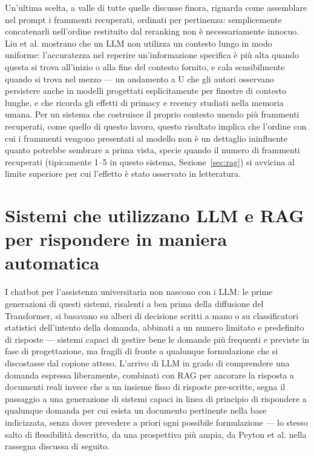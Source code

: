 Un'ultima scelta, a valle di tutte quelle discusse finora, riguarda come assemblare nel prompt i frammenti
recuperati, ordinati per pertinenza: semplicemente concatenarli nell'ordine restituito dal reranking non è
necessariamente innocuo. Liu et al. \cite{liu2023lostmiddle} mostrano che un LLM non utilizza un contesto lungo in
modo uniforme: l'accuratezza nel reperire un'informazione specifica è più alta quando questa si trova all'inizio o
alla fine del contesto fornito, e cala sensibilmente quando si trova nel mezzo --- un andamento a U che gli autori
osservano persistere anche in modelli progettati esplicitamente per finestre di contesto lunghe, e che ricorda gli
effetti di primacy e recency studiati nella memoria umana. Per un sistema che costruisce il proprio contesto
unendo più frammenti recuperati, come quello di questo lavoro, questo risultato implica che l'ordine con cui i
frammenti vengono presentati al modello non è un dettaglio ininfluente quanto potrebbe sembrare a prima vista, specie
quando il numero di frammenti recuperati (tipicamente 1--5 in questo sistema, Sezione~\ref{sec:rag}) si avvicina al
limite superiore per cui l'effetto è stato osservato in letteratura.

\section{Sistemi che utilizzano LLM e RAG per rispondere in maniera automatica}
\label{sec:sistemi-simili}

I chatbot per l'assistenza universitaria non nascono con i LLM: le prime generazioni di questi sistemi, risalenti a
ben prima della diffusione del Transformer, si basavano su alberi di decisione scritti a mano o su classificatori
statistici dell'intento della domanda, abbinati a un numero limitato e predefinito di risposte --- sistemi capaci di
gestire bene le domande più frequenti e previste in fase di progettazione, ma fragili di fronte a qualunque
formulazione che si discostasse dal copione atteso. L'arrivo di LLM in grado di comprendere una domanda espressa
liberamente, combinati con RAG per ancorare la risposta a documenti reali invece che a un insieme fisso di risposte
pre-scritte, segna il passaggio a una generazione di sistemi capaci in linea di principio di rispondere a qualunque
domanda per cui esista un documento pertinente nella base indicizzata, senza dover prevedere a priori ogni possibile
formulazione --- lo stesso salto di flessibilità descritto, da una prospettiva più ampia, da Peyton et al. nella
rassegna discussa di seguito.

